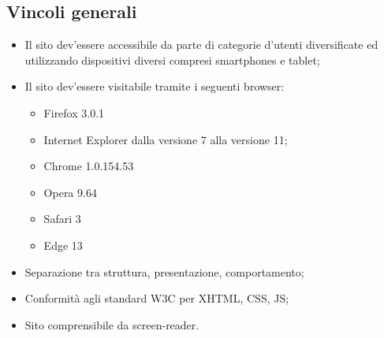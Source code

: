 {	\subsection{Vincoli generali}{
		\begin{itemize}\itemsep1pt
			\item Il sito dev'essere accessibile da parte di categorie d'utenti diversificate ed utilizzando dispositivi diversi compresi smartphones e tablet;
			\item Il sito dev'essere visitabile tramite i seguenti browser: 
				\begin{itemize}
					\item Firefox 3.0.1
					\item Internet Explorer dalla versione 7 alla versione 11; 
					\item Chrome 1.0.154.53
					\item Opera 9.64
					\item Safari 3
					\item Edge 13
				\end{itemize}
			\item Separazione tra struttura, presentazione, comportamento;
			\item Conformità agli standard W3C per XHTML, CSS, JS;
			\item Sito comprensibile da screen-reader.
		\end{itemize}
	}
}
